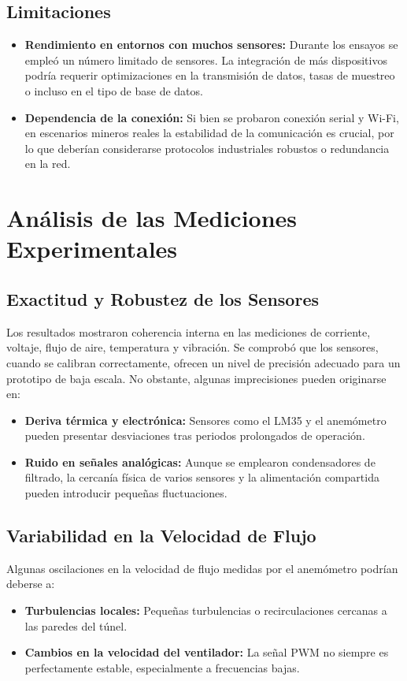 \subsection{Limitaciones}
\begin{itemize}
    \item \textbf{Rendimiento en entornos con muchos sensores:} Durante los ensayos se empleó un número limitado de sensores. La integración de más dispositivos podría requerir optimizaciones en la transmisión de datos, tasas de muestreo o incluso en el tipo de base de datos.
    \item \textbf{Dependencia de la conexión:} Si bien se probaron conexión serial y Wi-Fi, en escenarios mineros reales la estabilidad de la comunicación es crucial, por lo que deberían considerarse protocolos industriales robustos o redundancia en la red.
\end{itemize}

\section{Análisis de las Mediciones Experimentales}
\subsection{Exactitud y Robustez de los Sensores}
Los resultados mostraron coherencia interna en las mediciones de corriente, voltaje, flujo de aire, temperatura y vibración. Se comprobó que los sensores, cuando se calibran correctamente, ofrecen un nivel de precisión adecuado para un prototipo de baja escala. No obstante, algunas imprecisiones pueden originarse en:
\begin{itemize}
    \item \textbf{Deriva térmica y electrónica:} Sensores como el LM35 y el anemómetro pueden presentar desviaciones tras periodos prolongados de operación.
    \item \textbf{Ruido en señales analógicas:} Aunque se emplearon condensadores de filtrado, la cercanía física de varios sensores y la alimentación compartida pueden introducir pequeñas fluctuaciones.
\end{itemize}

\subsection{Variabilidad en la Velocidad de Flujo}
Algunas oscilaciones en la velocidad de flujo medidas por el anemómetro podrían deberse a:
\begin{itemize}
    \item \textbf{Turbulencias locales:} Pequeñas turbulencias o recirculaciones cercanas a las paredes del túnel.
    \item \textbf{Cambios en la velocidad del ventilador:} La señal PWM no siempre es perfectamente estable, especialmente a frecuencias bajas.
\end{itemize}

